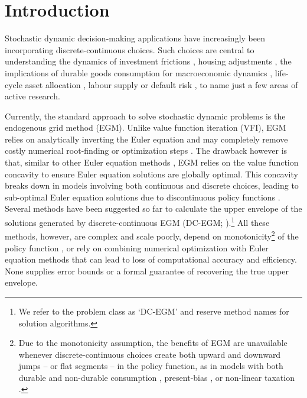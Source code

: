 \documentclass[12pt]{article}
\begin{document}
\section{Introduction}

Stochastic dynamic decision-making applications have increasingly been incorporating discrete-continuous choices. Such choices are central to understanding the dynamics of investment frictions \citep{Skiba1978, Khan2008}, housing adjustments \citep{Yogo2016a, Kaplan2020}, the implications of durable goods consumption for macroeconomic dynamics \citep{Kaplan2014,Berger2015}, life-cycle asset allocation \citep{Fagereng2019,Laibson2020}, labour supply \citep{Attanasio2018,ISKHAKOV2021401} or default risk \citep{Arellano2008,Arellano2016,Jang2023}, to name just a few areas of active research.

Currently, the standard approach to solve stochastic dynamic problems is the endogenous grid method (EGM).  Unlike value function iteration (VFI), EGM relies on analytically inverting the Euler equation \citep{Carroll2006} and may completely remove costly numerical root-finding or optimization steps \citep{Iskhakov2015}. The drawback however is that, similar to other Euler equation methods \citep{Coleman1990, Li2014}, EGM relies on the value function concavity to ensure Euler equation solutions are globally optimal. This concavity breaks down in models involving both continuous and discrete choices, leading to sub-optimal Euler equation solutions due to discontinuous policy functions \citep{Fella2014,Iskhakov2017}. Several methods have been suggested so far to calculate the upper envelope of the solutions generated by discrete-continuous EGM (DC-EGM; \cite{Fella2014, Iskhakov2017, Druedahl2017, Druedahl2021}).\footnote{We refer to the problem class as `DC-EGM' and reserve method names for solution algorithms.} All these methods, however, are complex and scale poorly, depend on monotonicity\footnote{Due to the monotonicity assumption, the benefits of EGM are unavailable whenever discrete-continuous choices create both upward and downward jumps -- or flat segments -- in the policy function, as in models with both durable and non-durable consumption \citep{Kaplan2014, Yogo2016a}, present-bias \citep{laibson21997}, or non-linear taxation \citep{Best2017, Gelber2020}.} of the policy function \citep{Iskhakov2017, Fella2014, Druedahl2017}, or rely on combining numerical optimization with Euler equation methods \citep{Druedahl2021} that can lead to loss of computational accuracy and efficiency. None supplies error bounds or a formal guarantee of recovering the true upper envelope. 
\end{document}
